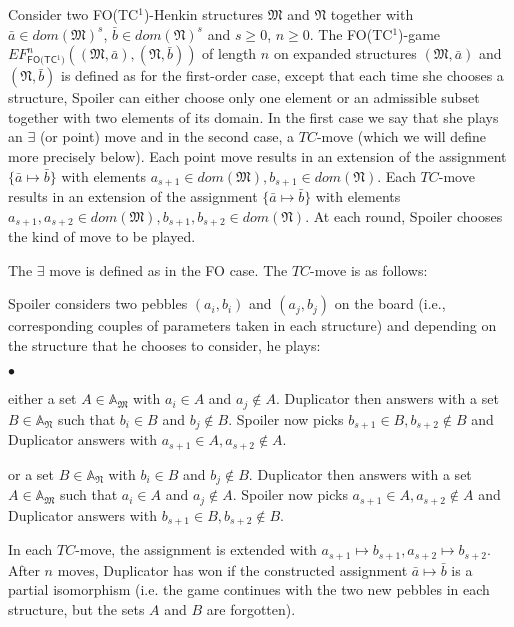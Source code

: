 \documentclass{LMCS}
\newcommand{\frM}{\mathfrak{M}}
\newcommand{\frN}{\mathfrak{N}}
\newcommand{\fo}{\textsf{FO}\xspace}
\newcommand{\fotc}{\textsf{FO(TC$^1$)}\xspace}
\begin{document}
\begin{defi}[\fotc Ehrenfeucht-Fra\"\i ss\'e Game]
Consider two \fotc-Henkin structures $\frM$ and $\frN$ together with
$\bar{a} \in dom(\frM)^s$, $\bar{b} \in dom(\frN)^s$ and $s \geq 0$, $n \geq 0$. The \fotc-game $EF_\fotc^n((\frM, \bar{a}),
(\frN, \bar{b}))$ of length $n$ on expanded structures
$(\frM, \bar{a})$ and $(\frN, \bar{b})$ is
defined as for the first-order case, except that each time she
chooses a structure, Spoiler can either choose only one element or an admissible subset together with two elements of its domain.
In the first case we say that she plays an $\exists$ (or point) move and in the second case, a $TC$-move (which we will define more precisely below).
Each point move results in an extension of the assignment $\{\bar{a}\mapsto \bar{b}\}$ with elements $a_{s+1} \in dom(\frM), b_{s+1} \in dom(\frN)$. Each $TC$-move results in an extension of the assignment $\{\bar{a}\mapsto
\bar{b}\}$ with elements $a_{s+1}, a_{s+2} \in dom(\frM), b_{s+1}, b_{s+2} \in dom(\frN)$. At each round, Spoiler chooses the kind of move to be played. 

The $\exists$ move is defined as in the \fo case. The $TC$-move is as follows:

Spoiler considers two pebbles $(a_i,b_i)$ and $(a_j,b_j)$ on the board (i.e., corresponding couples of parameters taken in each structure) and depending on the structure that he chooses to consider, he plays:
\begin{iteMize}{$\bullet$}
\item   either a set $A \in \mathbb{A}_\frM$ with $a_i \in A$ and $a_j \notin
A$. Duplicator then answers with a set $B \in \mathbb{A}_\frN$ such that
$b_i \in B$ and $b_j \notin B$.  Spoiler now picks $b_{s+1} \in B,
b_{s+2} \notin B$ and Duplicator answers with $a_{s+1} \in A, a_{s+2}
\notin A$.
\item   or a set $B \in \mathbb{A}_\frN$ with $b_i \in B$ and $b_j \notin
B$.  Duplicator then answers with a set $A \in \mathbb{A}_\frM$ such
that $a_i \in A$ and $a_j \notin A$. Spoiler now picks $a_{s+1} \in A,
a_{s+2} \notin A$ and Duplicator answers with $b_{s+1} \in B, b_{s+2}
\notin B$.
\end{iteMize}
In each $TC$-move, the assignment is extended with $a_{s+1} \mapsto
b_{s+1}, a_{s+2} \mapsto b_{s+2}$. After $n$ moves, Duplicator has won
if the constructed assignment $\bar{a} \mapsto \bar{b}$ is a
partial isomorphism (i.e. the game continues with the two new
pebbles in each structure, but the sets $A$ and $B$ are
forgotten).
\label{effotc}
\end{defi}
\end{document}
